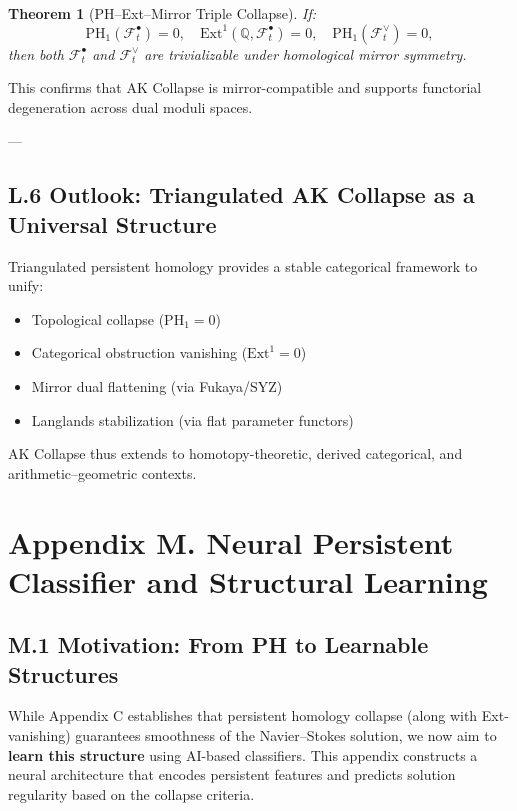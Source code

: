 \documentclass[11pt]{article}
\newtheorem{theorem}{Theorem}[section]
\theoremstyle{definition}
\begin{document}
\begin{theorem}[PH–Ext–Mirror Triple Collapse]
If:
\[
\mathrm{PH}_1(\mathcal{F}_t^\bullet) = 0, \quad \mathrm{Ext}^1(\mathbb{Q}, \mathcal{F}_t^\bullet) = 0, \quad \mathrm{PH}_1(\mathcal{F}_t^\vee) = 0,
\]
then both \( \mathcal{F}_t^\bullet \) and \( \mathcal{F}_t^\vee \) are trivializable under homological mirror symmetry.
\end{theorem}

This confirms that AK Collapse is mirror-compatible and supports functorial degeneration across dual moduli spaces.

---

\subsection*{L.6 Outlook: Triangulated AK Collapse as a Universal Structure}

Triangulated persistent homology provides a stable categorical framework to unify:

\begin{itemize}
  \item Topological collapse (\( \mathrm{PH}_1 = 0 \))  
  \item Categorical obstruction vanishing (\( \mathrm{Ext}^1 = 0 \))  
  \item Mirror dual flattening (via Fukaya/SYZ)  
  \item Langlands stabilization (via flat parameter functors)  
\end{itemize}

AK Collapse thus extends to homotopy-theoretic, derived categorical, and arithmetic–geometric contexts.


\section*{Appendix M. Neural Persistent Classifier and Structural Learning}

\subsection*{M.1 Motivation: From PH to Learnable Structures}

While Appendix C establishes that persistent homology collapse (along with Ext-vanishing) guarantees smoothness of the Navier--Stokes solution,  
we now aim to \textbf{learn this structure} using AI-based classifiers. This appendix constructs a neural architecture that encodes persistent features and predicts solution regularity based on the collapse criteria.
\end{document}
